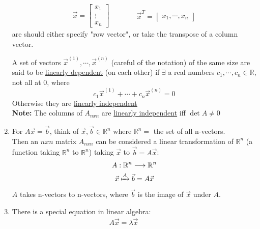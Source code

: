 \begin{enumerate}[label=\protect\circled{\arabic*}]
	\begin{equation*}
		\begin{split}
			\vec{x} = \begin{bmatrix}
				x_1\\
				\vdots\\
				x_n
			\end{bmatrix}
		\end{split}
		\quad \quad \quad
		\begin{split}
			\vec{x}^T = \begin{bmatrix}
				x_1, \cdots, x_n
			\end{bmatrix}
		\end{split}
	\end{equation*}
	are should either specify "row vector", or take the transpose of a column vector.
	\begin{definition}
		A set of vectors $\vec{x}^{(1)}, \cdots, \vec{x}^{(n)}$ (careful of the notation) of the same size are said to be \underline{linearly dependent} (on each other) if $\exists$ a real numbers $c_1, \cdots, c_n \in \mathbb{R}$, not all at 0, where
		\begin{equation*}
			c_1\vec{x}^{(1)} + \cdots + c_n\vec{x}^{(n)} = 0
		\end{equation*}
		Otherwise they are \underline{linearly independent}\\
		\textbf{Note: } The columns of $A_{nxn}$ are \underline{linearly independent} iff $\det A \neq 0$
	\end{definition}
	\item For $A\vec{x} = \vec{b}$, think of $\vec{x}, \vec{b} \in \mathbb{R}^n$ where $\mathbb{R}^n = $ the set of all n-vectors.\\ 
	Then an $nxn$ matrix $A_{nxn}$ can be considered a linear transformation of $\mathbb{R}^n$ (a function taking $\mathbb{R}^n$ to $\mathbb{R}^n$) taking $\vec{x}$ to $\vec{b} = A\vec{x}$:
	\begin{gather*}
		A: \mathbb{R}^n \longrightarrow \mathbb{R}^n\\
		\vec{x} \xmapsto{A} \vec{b} = A\vec{x}
	\end{gather*}
	$A$ takes n-vectors to n-vectors, where $\vec{b}$ is the image of $\vec{x}$ under $A$.
	\item There is a special equation in linear algebra:
	\begin{equation*}
		\begin{split}
			\boxed{A\vec{x} = \lambda \vec{x}}
		\end{split}
		\quad \quad \quad

\end{equation*}
\end{enumerate}
